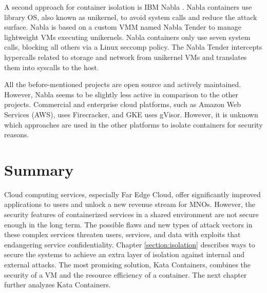 A second approach for container isolation is IBM Nabla \cite{Nabla}. Nabla containers use library OS, also known as unikernel, to avoid system calls and reduce the attack surface. Nabla is based on a custom VMM named Nabla Tender to manage lightweight VMs executing unikernels. Nabla containers only use seven system calls, blocking all others via a Linux seccomp policy. The Nabla Tender intercepts hypercalls related to storage and network from unikernel VMs and translates them into syscalls to the host. \cite{Debab2021}

All the before-mentioned projects are open source and actively maintained. However, Nabla seems to be slightly less active in comparison to the other projects. Commercial and enterprise cloud platforms, such as Amazon Web Services (AWS), uses Firecracker, and GKE uses gVisor. However, it is unknown which approaches are used in the other platforms to isolate containers for security reasons.

\section{Summary}

Cloud computing services, especially Far Edge Cloud, offer significantly improved applications to users and unlock a new revenue stream for MNOs. However, the security features of containerized services in a shared environment are not secure enough in the long term. The possible flaws and new types of attack vectors in these complex services threaten users, services, and data with exploits that endangering service confidentiality. Chapter \ref{section:isolation} describes ways to secure the systems to achieve an extra layer of isolation against internal and external attacks. The most promising solution, Kata Containers, combines the security of a VM and the resource efficiency of a container. The next chapter further analyzes Kata Containers.
